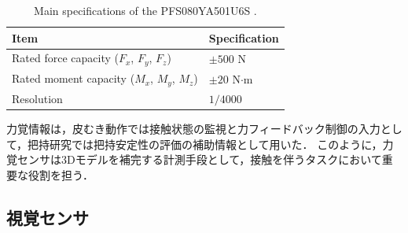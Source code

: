 \begin{table}[ht]
  \centering
  \caption{Main specifications of the PFS080YA501U6S \cite{leptrino_6axis_force_sensor}.}
  \label{tab:system:force-sensor-spec}
  \begingroup
  \footnotesize
  \setlength{\tabcolsep}{4pt}
  \renewcommand{\arraystretch}{0.8}
  \begin{tabular}{@{}ll@{}}
    \toprule
    Item & Specification \\
    \midrule
    Rated force capacity ($F_x$, $F_y$, $F_z$) & $\pm 500$ N \\
    Rated moment capacity ($M_x$, $M_y$, $M_z$) & $\pm 20$ N$\cdot$m \\
    Resolution & $1/4000$ \\
    \bottomrule
  \end{tabular}
  \endgroup
\end{table}

力覚情報は，皮むき動作では接触状態の監視と力フィードバック制御の入力として，把持研究では把持安定性の評価の補助情報として用いた．
このように，力覚センサは3Dモデルを補完する計測手段として，接触を伴うタスクにおいて重要な役割を担う．

\subsection{視覚センサ}
\label{sec:system:hardware:vision-sensor}

